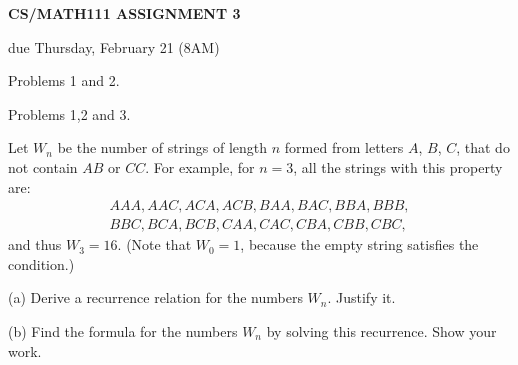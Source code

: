 \documentclass{article}
\begin{document}

\centerline{\large \bf CS/MATH111 ASSIGNMENT 3}
\centerline{due Thursday, February 21 (8AM)}

\vskip 0.2in
 Problems 1 and 2.

 Problems 1,2 and 3.

\vskip 0.1in


\begin{problem}
Let $W_n$ be the number of strings of
length $n$ formed from letters $A$, $B$, $C$, 
that do not contain $AB$ or $CC$.
For example, for $n=3$, all the strings with this
property are:
%
\begin{align*}
	AAA, AAC, ACA, ACB, BAA, BAC, BBA, BBB, 
	\\
	 BBC, BCA, BCB, CAA, CAC, CBA, CBB, CBC,
\end{align*}
%
and thus $W_3 = 16$. (Note that $W_0 = 1$, because the
empty string satisfies the condition.)

\noindent (a) Derive a recurrence relation for
        the numbers $W_n$. Justify it.

\noindent (b) Find the formula for the numbers $W_n$
                by solving this recurrence.
                Show your work.
\end{problem}
\end{document}
